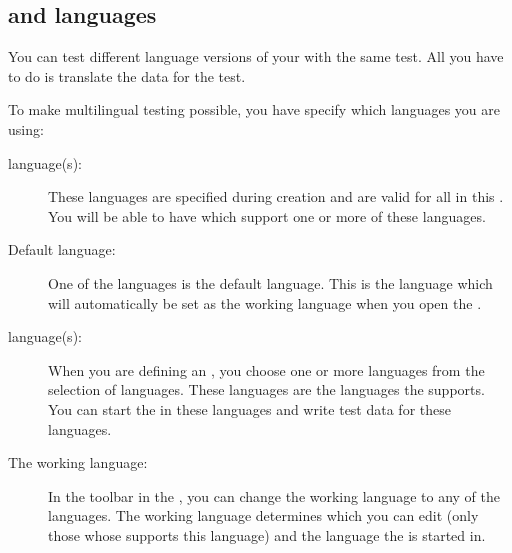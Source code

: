
\subsection{\gdproject{} and \gdaut{}  languages}

You can test different language versions of your \gdaut{} with the same test. All you have to do is translate the data for the test. 

To make multilingual testing possible, you have specify which languages you are using: 

\begin{description}
\item [\gdproject language(s):]{These languages are specified during \gdproject{} creation and are valid for all \gdauts{} in this \gdproject{}. You will be able to have \gdauts{} which support one or more of these languages.}
\item[Default language:]{One of the \gdproject{} languages is the default language. This is the language which will automatically be set as the working language when you open the \gdproject{}. }
\item[\gdaut language(s):]{When you are defining an \gdaut{}, you choose one or more \gdaut{} languages from the selection of \gdproject{} languages. These languages are the languages the \gdaut{} supports. You can start the \gdaut{} in these languages and write test data for these languages. }
\item[The working language:]{In the toolbar in the \ite{}, you can change the working language to any of the \gdproject{} languages. The working language determines which \gdsuites{} you can edit (only those whose \gdaut{} supports this language) and the language the \gdaut{} is started in. }
\end{description}

